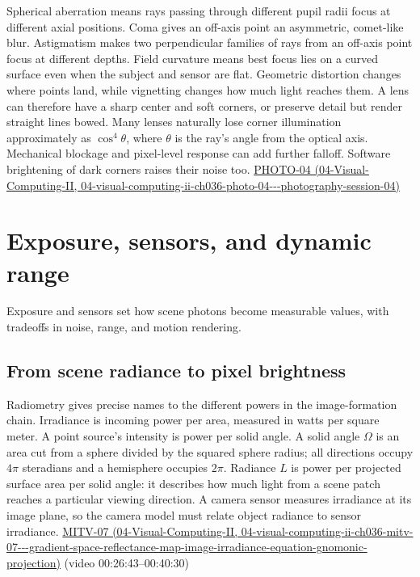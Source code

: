 Spherical aberration means rays passing through different pupil radii focus at different axial positions. Coma gives an off-axis point an asymmetric, comet-like blur. Astigmatism makes two perpendicular families of rays from an off-axis point focus at different depths. Field curvature means best focus lies on a curved surface even when the subject and sensor are flat. Geometric distortion changes where points land, while vignetting changes how much light reaches them. A lens can therefore have a sharp center and soft corners, or preserve detail but render straight lines bowed. Many lenses naturally lose corner illumination approximately as \(\cos^4\theta\), where \(\theta\) is the ray's angle from the optical axis. Mechanical blockage and pixel-level response can add further falloff. Software brightening of dark corners raises their noise too. \href{../04-Visual-Computing-II/main.pdf\#nameddest=04-visual-computing-ii-ch036-photo-04---photography-session-04}{PHOTO-04 (04-Visual-Computing-II, 04-visual-computing-ii-ch036-photo-04-\/-\/-photography-session-04)}

\section{Exposure, sensors, and dynamic range}\label{03-visual-computing-i-ch003-exposure-sensors-and-dynamic-range}

Exposure and sensors set how scene photons become measurable values, with tradeoffs in noise, range, and motion rendering.

\subsection{From scene radiance to pixel brightness}\label{03-visual-computing-i-ch003-from-scene-radiance-to-pixel-brightness}

Radiometry gives precise names to the different powers in the image-formation chain. Irradiance is incoming power per area, measured in watts per square meter. A point source's intensity is power per solid angle. A solid angle \(\Omega\) is an area cut from a sphere divided by the squared sphere radius; all directions occupy \(4\pi\) steradians and a hemisphere occupies \(2\pi\). Radiance \(L\) is power per projected surface area per solid angle: it describes how much light from a scene patch reaches a particular viewing direction. A camera sensor measures irradiance at its image plane, so the camera model must relate object radiance to sensor irradiance. \href{../04-Visual-Computing-II/main.pdf\#nameddest=04-visual-computing-ii-ch036-mitv-07---gradient-space-reflectance-map-image-irradiance-equation-gnomonic-projection}{MITV-07 (04-Visual-Computing-II, 04-visual-computing-ii-ch036-mitv-07-\/-\/-gradient-space-reflectance-map-image-irradiance-equation-gnomonic-projection)} (video 00:26:43--00:40:30)


